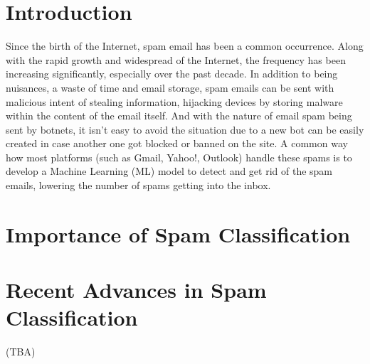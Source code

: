 \documentclass[conference]{IEEEtran}
\begin{document}
    \section{Introduction}
    \label{sec:introduction}
    Since the birth of the Internet, spam email has been a common occurrence.
    Along with the rapid growth and widespread of the Internet, the frequency has been increasing significantly, especially over the past decade.
    In addition to being nuisances, a waste of time and email storage, spam emails can be sent with malicious intent of stealing information, hijacking devices by storing malware within the content of the email itself.
    And with the nature of email spam being sent by botnets, it isn't easy to avoid the situation due to a new bot can be easily created in case another one got blocked or banned on the site.
    A common way how most platforms (such as Gmail, Yahoo!, Outlook) handle these spams is to develop a Machine Learning (ML) model to detect and get rid of the spam emails, lowering the number of spams getting into the inbox.

    \section{Importance of Spam Classification}
    \label{sec:importance-of-spam-classification}
    

    \section{Recent Advances in Spam Classification}(TBA)
    \label{sec:recent-advances-in-spam-classification}
\end{document}
